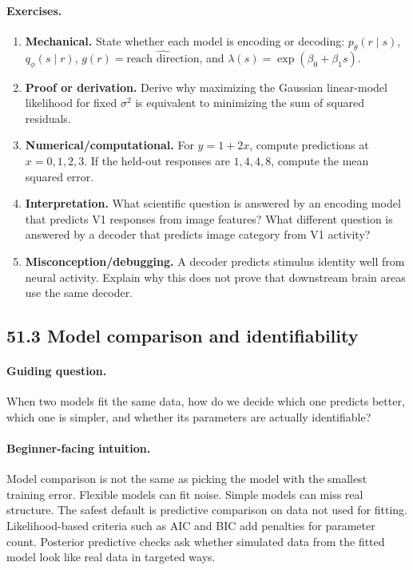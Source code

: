 \paragraph{Exercises.}
\begin{enumerate}[label=\textbf{51.2.\arabic*.}, leftmargin=*]
\item \textbf{Mechanical.} State whether each model is encoding or decoding: \(p_\theta(r\mid s)\), \(q_\phi(s\mid r)\), \(g(r)=\widehat{\text{reach direction}}\), and \(\lambda(s)=\exp(\beta_0+\beta_1s)\).
\item \textbf{Proof or derivation.} Derive why maximizing the Gaussian linear-model likelihood for fixed \(\sigma^2\) is equivalent to minimizing the sum of squared residuals.
\item \textbf{Numerical/computational.} For \(y=1+2x\), compute predictions at \(x=0,1,2,3\). If the held-out responses are \(1,4,4,8\), compute the mean squared error.
\item \textbf{Interpretation.} What scientific question is answered by an encoding model that predicts V1 responses from image features? What different question is answered by a decoder that predicts image category from V1 activity?
\item \textbf{Misconception/debugging.} A decoder predicts stimulus identity well from neural activity. Explain why this does not prove that downstream brain areas use the same decoder.
\end{enumerate}

\subsection{51.3 Model comparison and identifiability}

\paragraph{Guiding question.}
When two models fit the same data, how do we decide which one predicts better, which one is simpler, and whether its parameters are actually identifiable?

\paragraph{Beginner-facing intuition.}
Model comparison is not the same as picking the model with the smallest training error. Flexible models can fit noise. Simple models can miss real structure. The safest default is predictive comparison on data not used for fitting. Likelihood-based criteria such as AIC and BIC add penalties for parameter count. Posterior predictive checks ask whether simulated data from the fitted model look like real data in targeted ways.

